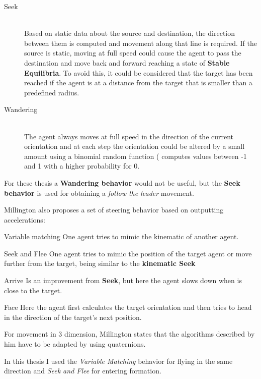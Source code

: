 \begin{description}
\item [Seek] \hfill \\ Based on static data about the source and destination, the direction
between them is computed and movement along that line is required. If the source
is static, moving at full speed could cause the agent to pass the destination
and move back and forward reaching a state of \textbf{Stable Equilibria}. To 
avoid this, it could be considered that the target has been reached if the 
agent is at a distance from the target that is smaller than a predefined
radius.
\item [Wandering] \hfill \\ The agent always moves at full speed in the direction
of the current orientation and at each step the orientation could be
altered by a small amount using a binomial random function ( computes values between
-1 and 1 with a higher probability for 0.
\end{description}

For these thesis a \textbf{Wandering behavior} would not be useful, but the 
\textbf{Seek behavior} is used for obtaining a \textit{follow the leader} movement.

Millington also proposes a set of steering behavior based on outputting accelerations:
\begin{description}
\item {Variable matching} One agent tries to mimic the kinematic of another agent.
\item {Seek and Flee} One agent tries to mimic the position of the target agent
or move further from the target, being similar to the \textbf{kinematic Seek}
\item {Arrive} Is an improvement from \textbf{Seek}, but here the agent slows 
down when is close to the target.
\item {Face} Here the agent first calculates the target orientation and then
tries to head in the direction of the target's next position.
\end{description}

For movement in 3 dimension, Millington states that the algorithms described by
him have to be adapted by using quaternions.

In this thesis I used the \textit{Variable Matching} behavior for flying in the
same direction and \textit{Seek and Flee} for entering formation.